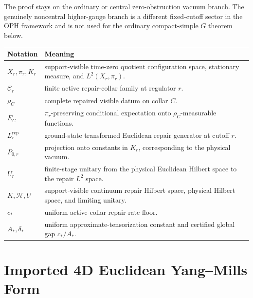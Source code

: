 \documentclass[11pt]{article}
\numberwithin{equation}{section}
\theoremstyle{remark}
\newcommand{\Rep}{\mathrm{rep}}
\newcommand{\Hcal}{\mathcal H}
\begin{document}
The proof stays on the ordinary or central zero-obstruction vacuum branch. The genuinely
noncentral higher-gauge branch is a different fixed-cutoff sector in the OPH
framework and is not
used for the ordinary compact-simple \(G\) theorem below.

\begin{longtable}{@{}L{0.24\textwidth}L{0.68\textwidth}@{}}
\toprule
Notation & Meaning \\
\midrule
\endhead
\(X_r,\pi_r,K_r\) & support-visible time-zero quotient configuration space, stationary measure, and \(L^2(X_r,\pi_r)\). \\
\(\mathcal C_r\) & finite active repair-collar family at regulator \(r\). \\
\(\rho_C\) & complete repaired visible datum on collar \(C\). \\
\(E_C\) & \(\pi_r\)-preserving conditional expectation onto \(\rho_C\)-measurable functions. \\
\(L_r^{\Rep}\) & ground-state transformed Euclidean repair generator at cutoff \(r\). \\
\(P_{0,r}\) & projection onto constants in \(K_r\), corresponding to the physical vacuum. \\
\(U_r\) & finite-stage unitary from the physical Euclidean Hilbert space to the repair \(L^2\) space. \\
\(K,\Hcal,U\) & support-visible continuum repair Hilbert space, physical Hilbert space, and limiting unitary. \\
\(c_*\) & uniform active-collar repair-rate floor. \\
\(A_*,\delta_*\) & uniform approximate-tensorization constant and certified global gap \(c_*/A_*\). \\
\bottomrule
\end{longtable}

\section{Imported 4D Euclidean Yang--Mills Form}
\end{document}
